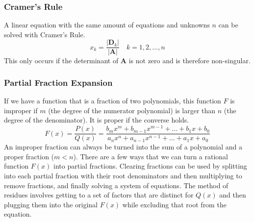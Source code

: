 \subsubsection{Cramer's Rule}
A linear equation with the same amount of equations and unknowns $n$ can be solved with Cramer's Rule.
\begin{equation}
    x_k = \frac{|\textbf{D}_k|}{|\textbf{A}|} \quad k = 1,2,\dots, n
\end{equation}
This only occurs if the determinant of \textbf{A} is not zero and is therefore non-singular.

\subsubsection{Partial Fraction Expansion}
If we have a function that is a fraction of two polynomials, this function $F$ is improper if $m$ (the degree of the numerator polynomial) is larger than $n$ (the degree of the denominator).
It is proper if the converse holds.
\begin{equation}
    F(x) = \frac{P(x)}{Q(x)} = \frac{b_m x^m + b_{m-1} x^{m-1} + \dots + b_1 x + b_0}{a_n x^n + a_{n-1} x^{n-1} + \dots + a_1 x + a_0}
\end{equation}
An improper fraction can always be turned into the sum of a polynomial and a proper fraction ($m < n$).
There are a few ways that we can turn a rational function $F(x)$ into partial fractions.
Clearing fractions can be used by splitting into each partial fraction with their root denominators and then multiplying to remove fractions, and finally solving a system of equations.
The method of residues involves getting to a set of factors that are distinct for $Q(x)$ and then plugging them into the original $F(x)$ while excluding that root from the equation.
